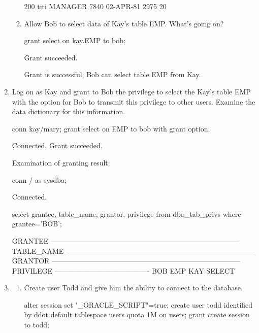 \documentclass{article}
\begin{document}
\begin{enumerate}
\begin{enumerate}
\begin{messageshell}
       200 titi       MANAGER         7840 02-APR-81       2975
        20

\end{messageshell}

 \item{Allow Bob to select data of Kay’s table EMP. What's going on?}
\begin{sqlshell}
grant select on kay.EMP to bob;
\end{sqlshell}
\begin{messageshell}
Grant succeeded.
\end{messageshell}
Grant is successful, Bob can select table EMP from Kay.
 \end{enumerate}

\item{Log on as Kay and grant to Bob the privilege to select the Kay’s table EMP with the option for Bob to transmit this privilege to other users. Examine the data dictionary for this information.}
\begin{sqlshell}
conn kay/mary;
grant select on EMP to bob with grant option;
\end{sqlshell}
\begin{messageshell}
Connected.
Grant succeeded.
\end{messageshell}
Examination of granting result:
\begin{sqlshell}
conn / as sysdba;
\end{sqlshell}
\begin{messageshell}
Connected.
\end{messageshell}
\begin{sqlshell}
select grantee, table_name, grantor, privilege from dba_tab_privs where grantee='BOB';
\end{sqlshell}
\begin{messageshell}
GRANTEE
--------------------------------------------------------------------------------
TABLE_NAME
--------------------------------------------------------------------------------
GRANTOR
--------------------------------------------------------------------------------
PRIVILEGE
----------------------------------------
BOB
EMP
KAY
SELECT

\end{messageshell}
\item{ }
 \begin{enumerate}
 \item{Create user Todd and give him the ability to connect to the database.}
\begin{sqlshell}
alter session set "_ORACLE_SCRIPT"=true;
create user todd identified by ddot default tablespace users quota 1M on users;
grant create session to todd;
\end{sqlshell}


\end{enumerate}
\end{enumerate}
\end{document}
